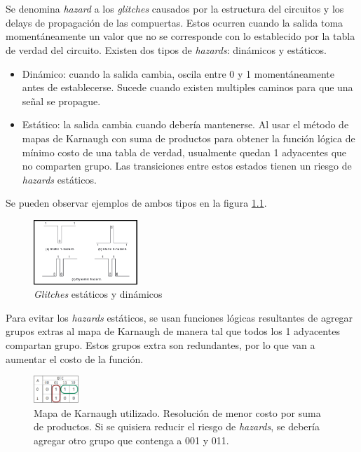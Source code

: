 \documentclass[../../e3_tp2_main.tex]{subfiles}
\begin{document}
\chapter{}

Se denomina \textit{hazard} a los \textit{glitches} causados por la estructura del circuitos y los delays de propagaci\'on de las compuertas. Estos ocurren cuando la salida toma moment\'aneamente un valor que no se corresponde con lo establecido por la tabla de verdad del circuito. Existen dos tipos de \textit{hazards}: din\'amicos y est\'aticos.
\begin{itemize}
	\item Din\'amico: cuando la salida cambia, oscila entre 0 y 1 moment\'aneamente antes de establecerse. Sucede cuando existen multiples caminos para que una se\~nal se propague. 
	\item Est\'atico: la salida cambia cuando deber\'ia mantenerse. Al usar el m\'etodo de mapas de Karnaugh con suma de productos para obtener la funci\'on l\'ogica de m\'inimo costo de una tabla de verdad, usualmente quedan 1 adyacentes que no comparten grupo. Las transiciones entre estos estados tienen un riesgo de \textit{hazards} est\'aticos. 
\end{itemize}
Se pueden observar ejemplos de ambos tipos en la figura \ref{fig:ej_3_hazards}.


\begin{figure}[H]	%
	\centering
	\includegraphics[width=0.35\textwidth]{hazard.png}
	\caption{\textit{Glitches} est\'aticos y din\'amicos \protect\footnotemark}
	\label{fig:ej_3_hazards}
\end{figure}



Para evitar los \textit{hazards} est\'aticos, se usan funciones l\'ogicas resultantes de agregar grupos extras al mapa de Karnaugh de manera tal que todos los 1 adyacentes compartan grupo. Estos grupos extra son redundantes, por lo que van a aumentar el costo de la funci\'on.

\begin{figure}[H]	%
	\centering
	\includegraphics[width=0.15\textwidth]{kmap.png}
	\caption{Mapa de Karnaugh utilizado. Resoluci\'on de menor costo por suma de productos. Si se quisiera reducir el riesgo de \textit{hazards}, se deber\'ia agregar otro grupo que contenga a 001 y 011.}
	\label{fig:ej_3_kmap}
\end{figure}
\end{document}

